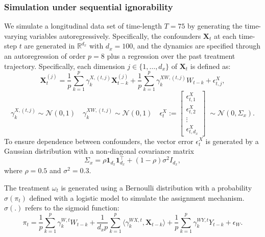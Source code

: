 \documentclass[10pt]{article} %
\begin{document}
\subsubsection{Simulation under sequential ignorability}
\label{appendix:ar_sim_descrip}
We simulate a longitudinal data set of time-length $T=75$ by generating the time-varying variables autoregressively. Specifically, the confounders $\mathbf{X}_t$ at each time-step $t$ are generated in $\mathbb{R}^{d_x}$ with $d_x = 100$, and the dynamics are specified through an autoregression of order $p=8$ plus a regression over the past treatment trajectory. Specifically, each dimension $j\in \{1, \dots, d_x\} $ of  $\mathbf{X}_t$ is defined as:
\begin{equation*}
    \mathbf{X}_t^{(j)} =  \frac{1}{p}\sum_{k = 1}^{p}\gamma_{k}^{X,(t,j)}\mathbf{X}_{t-k}^{(j)} + \frac{1}{p}\sum_{k = 1}^{p}\gamma_{k}^{XW,(t,j)}W_{t-k}+ 
 \epsilon_{t,j}^X,
\end{equation*}
\begin{equation*}
     \gamma_{k}^{X,(t,j)} \sim \mathcal{N}(0, 1) \quad \gamma_{k}^{XW,(t,j)} \sim \mathcal{N}(0, 1) \quad  \epsilon_t^{X}:= \begin{bmatrix} \epsilon_{t,1}^X  \\\epsilon_{t,2}^X  \\ \vdots \\ \epsilon_{t,d_x}^X  \end{bmatrix} \; \sim \mathcal{N}(0, \Sigma_x).
\end{equation*}
To ensure dependence between confounders, the vector error $\epsilon_t^{X}$ is generated by a Gaussian distribution with a non-diagonal covariance matrix 
\[
\Sigma_x = \rho \mathbf{1}_{d_x}\mathbf{1}_{d_x}^\intercal +(1-\rho)\sigma^2I_{d_x},
\]
where $\rho = 0.5$ and $\sigma^2 = 0.3$.

The treatment $\omega_t$ is generated using a Bernoulli distribution with a probability $\sigma(\pi_t)$ defined with a logistic model to simulate the assignment mechanism. $\sigma(.)$ refers to the sigmoid function:
\[
\pi_t = \frac{1}{p}\sum_{k=1}^{p} \gamma_{k}^{W,t}W_{t-k} + \frac{1}{d_xp}\sum_{k=1}^{p} \langle \gamma_{k}^{WX,t}, \mathbf{X}_{t-k} \rangle + \frac{1}{p}\sum_{k=1}^{p} \gamma_{k}^{WY,t}Y_{t-k} + \epsilon_W.
\]
\end{document}
